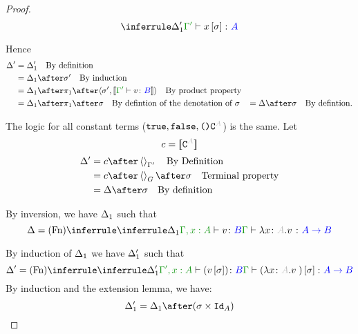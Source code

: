 \documentclass{report}
\begin{document}
\begin{framed}
\begin{proof}
        \begin{equation}
            \treeruleI{\D_1'}{\typerelation{\G'}{x\ssi}{A}}
        \end{equation}
        
        
        
        Hence
        \begin{align*}
            \D' & = \D_1' \qt{By definition}\\
                & = \D_1\after\si'\qt{By induction}\\
                & = \D_1\after\p\after\pr{\si'}{\deno{\typerelation{\G'}{v}{B}}}\qt{By product property}\\
                & = \D_1\after\p\after\si\qt{By defintion of the denotation of $\si$}
                & = \D\after\si\qt{By defintion.}
        \end{align*}
        
        The logic for all constant terms ($\t,\f,\u\const{A}$) is the same.
        Let
        \begin{equation}
            c = \deno{\const{A}}
        \end{equation}
        \begin{align*}
            \D' & = c\after\term{\G'}\qt{By Definition}\\
                & = c\after\term{G}\after\si\qt{Terminal property}\\
                & = \D\after\si\qt{By definition}
        \end{align*}
        
        By inversion, we have $\Delta_1$ such that
        \begin{equation}
            \D = \ntreeruleI{Fn}{
                \treeruleI{\D_1}{\typerelation{\G, x:A}{v}{B}}
            }{\typerelation{\G}{\lam{x}{A}{v}}{\ab}}
        \end{equation}
        
        By induction of $\Delta_1$ we have $\Delta_1'$ such that
        \begin{equation}
            \D' = \ntreeruleI{Fn}{
                \treeruleI{\D_1'}{\typerelation{\G', x:A}{(v\ssi)}{B}}
            }{\typerelation{\G}{(\lam{x}{A}{v})\ssi}{\ab}}
        \end{equation}
        By induction and the extension lemma, we have:
        \begin{equation}
            \D_1' = \D_1\after(\si\times\Id{A})
        \end{equation}
        

\end{proof}
\end{framed}
\end{document}
